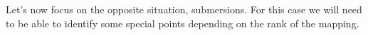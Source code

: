 %
%
%


Let's now focus on the opposite situation, submersions.
For this case we will need to be able to identify some special points depending on the rank of the mapping.

